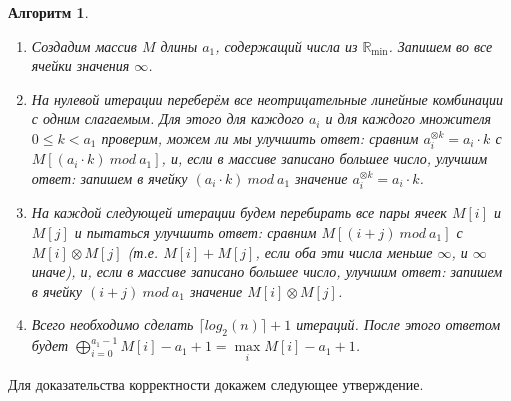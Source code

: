 \documentclass[12pt]{article}
\newtheorem{algorithm}[theorem]{Алгоритм}
\theoremstyle{definition}
\begin{document}
\begin{algorithm} { \ }
\label{algorithm}
\begin{enumerate}
	\item Создадим массив $M$ длины $a_1$, содержащий числа из $\mathbb{R}_{\min}$. Запишем во все ячейки значения $\infty$.
	
	\item На нулевой итерации переберём все неотрицательные линейные комбинации с одним слагаемым. Для этого для каждого $a_i$ и для каждого множителя $0 \le k < a_1$ проверим, можем ли мы улучшить ответ: сравним $a_i^{\otimes k} = a_i \cdot k$ с $M[(a_i \cdot k) \ mod \ a_1]$, и, если в массиве записано большее число, улучшим ответ: запишем в ячейку $(a_i \cdot k) \ mod \ a_1$ значение $a_i^{\otimes k} = a_i \cdot k$.
	
	\item На каждой следующей итерации будем перебирать все пары ячеек $M[i]$ и $M[j]$ и пытаться улучшить ответ: сравним $M[(i + j) \ mod \ a_1]$ с $M[i] \otimes M[j]$ (т.е. $M[i] + M[j]$, если оба эти числа меньше $\infty$, и $\infty$ иначе), и, если в массиве записано большее число, улучшим ответ: запишем в ячейку $(i + j) \ mod \ a_1$ значение $M[i] \otimes M[j]$.
	
	\item Всего необходимо сделать $\lceil log_2(n) \rceil + 1$ итераций. После этого ответом будет $\bigoplus \limits_{i = 0}^{a_1 - 1} M[i] - a_1 + 1 = \max\limits_{i} M[i] - a_1 + 1$.
\end{enumerate}
\end{algorithm}

Для доказательства корректности докажем следующее утверждение.
\end{document}

